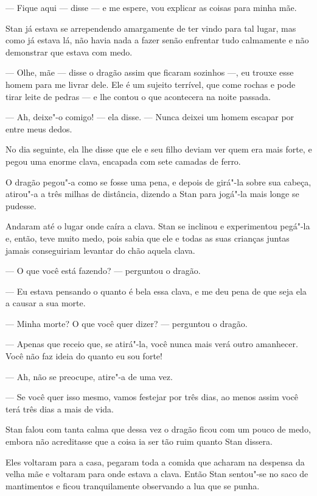 --- Fique aqui --- disse --- e me espere, vou explicar as coisas para minha
mãe.

Stan já estava se arrependendo amargamente de ter vindo para tal
lugar, mas como já estava lá, não havia nada a fazer senão enfrentar
tudo calmamente e não demonstrar que estava com medo.

--- Olhe, mãe --- disse o dragão assim que ficaram sozinhos ---, eu trouxe
esse homem para me livrar dele. Ele é um sujeito terrível, que come
rochas e pode tirar leite de pedras --- e lhe contou o que acontecera
na noite passada.

--- Ah, deixe"-o comigo! --- ela disse. --- Nunca deixei um homem escapar por
entre meus dedos.

No dia seguinte, ela lhe disse que ele e seu filho deviam ver quem era
mais forte, e pegou uma enorme clava, encapada com sete camadas de ferro.

O dragão pegou"-a como se fosse uma pena, e depois de girá"-la sobre sua
cabeça, atirou"-a a três milhas de distância, dizendo a Stan para
jogá"-la mais longe se pudesse.

Andaram até o lugar onde caíra a clava. Stan se inclinou e
experimentou pegá"-la e, então, teve muito medo, pois sabia
que ele e todas as suas crianças juntas jamais conseguiriam levantar do
chão aquela clava. 

--- O que você está fazendo? --- perguntou o dragão.

--- Eu estava pensando o quanto é bela essa clava, e me deu pena de que
seja ela a causar a sua morte.

--- Minha morte? O que você quer dizer? --- perguntou o dragão.

--- Apenas que receio que, se atirá"-la, você nunca mais verá outro
amanhecer. Você não faz ideia do quanto eu sou forte!

--- Ah, não se preocupe, atire"-a de uma vez.

--- Se você quer isso mesmo, vamos festejar por três dias, ao menos
assim você terá três dias a mais de vida.

Stan falou com tanta calma que dessa vez o dragão ficou com um pouco
de medo, embora não acreditasse que a coisa ia ser tão ruim quanto
Stan dissera.

Eles voltaram para a casa, pegaram toda a comida que acharam na
despensa da velha mãe e voltaram para onde estava a clava. Então
Stan sentou"-se no saco de mantimentos e ficou tranquilamente
observando a lua que se punha.

